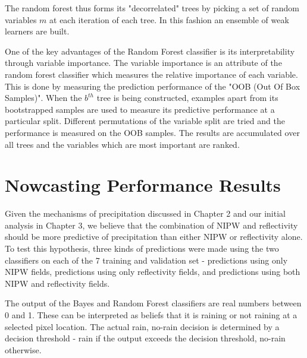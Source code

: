 \documentclass[proposal]{umassthesis}
\begin{document}
The random forest thus forms its "decorrelated" trees by picking a set of random variables $m$ at each iteration of each tree. In this fashion an ensemble of weak learners are built.

 One of the key advantages of the Random Forest classifier is its interpretability through variable importance. The variable importance is an attribute of the random forest classifier which measures the relative importance of each variable. This is done by measuring the prediction performance of the "OOB (Out Of Box Samples)". When the $b^{th}$ tree is being constructed, examples apart from its bootstrapped samples are used to measure its predictive performance at a particular split. Different permutations of the variable split are tried and the performance is measured on the OOB samples. The results are accumulated over all trees and the variables which are most important are ranked.
 
 \section{Nowcasting Performance Results}
 
Given the mechanisms of precipitation discussed in Chapter 2 and our initial analysis in Chapter 3, we believe that the combination of NIPW and reflectivity should be more predictive of precipitation than either NIPW or reflectivity alone. To test this hypothesis, three kinds of predictions were made using the two classifiers on each of the 7 training and validation set - predictions using only NIPW fields, predictions using only reflectivity fields, and predictions using both NIPW and reflectivity fields. 

The output of the Bayes and Random Forest classifiers are real numbers between 0 and 1. These can be interpreted as beliefs that it is raining or not raining at a selected pixel location. The actual rain, no-rain decision is determined by a decision threshold - rain if the output exceeds the decision threshold, no-rain otherwise.
\end{document}
